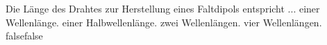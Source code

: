     {Die Länge des Drahtes zur Herstellung eines Faltdipols entspricht ...}
    {einer Wellenlänge.}
    {einer Halbwellenlänge.}
    {zwei Wellenlängen.}
    {vier Wellenlängen.}
    {false}{false}
